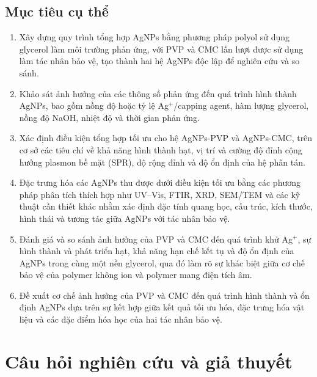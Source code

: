 \subsection{Mục tiêu cụ thể}
\begin{enumerate}
  \item Xây dựng quy trình tổng hợp AgNPs bằng phương pháp polyol sử dụng glycerol làm môi trường phản ứng, với PVP và CMC lần lượt được sử dụng làm tác nhân bảo vệ, tạo thành hai hệ AgNPs độc lập để nghiên cứu và so sánh.
  \item Khảo sát ảnh hưởng của các thông số phản ứng đến quá trình hình thành AgNPs, bao gồm nồng độ hoặc tỷ lệ Ag$^+$/capping agent, hàm lượng glycerol, nồng độ NaOH, nhiệt độ và thời gian phản ứng.
  \item Xác định điều kiện tổng hợp tối ưu cho hệ AgNPs-PVP và AgNPs-CMC, trên cơ sở các tiêu chí về khả năng hình thành hạt, vị trí và cường độ đỉnh cộng hưởng plasmon bề mặt (SPR), độ rộng đỉnh và độ ổn định của hệ phân tán.
  \item Đặc trưng hóa các AgNPs thu được dưới điều kiện tối ưu bằng các phương pháp phân tích thích hợp như UV--Vis, FTIR, XRD, SEM/TEM và các kỹ thuật cần thiết khác nhằm xác định đặc tính quang học, cấu trúc, kích thước, hình thái và tương tác giữa AgNPs với tác nhân bảo vệ.
  \item Đánh giá và so sánh ảnh hưởng của PVP và CMC đến quá trình khử Ag$^+$, sự hình thành và phát triển hạt, khả năng hạn chế kết tụ và độ ổn định của AgNPs trong cùng một nền glycerol, qua đó làm rõ sự khác biệt giữa cơ chế bảo vệ của polymer không ion và polymer mang điện tích âm.
  \item Đề xuất cơ chế ảnh hưởng của PVP và CMC đến quá trình hình thành và ổn định AgNPs dựa trên sự kết hợp giữa kết quả tối ưu hóa, đặc trưng hóa vật liệu và các đặc điểm hóa học của hai tác nhân bảo vệ.
\end{enumerate}

\section{Câu hỏi nghiên cứu và giả thuyết}
